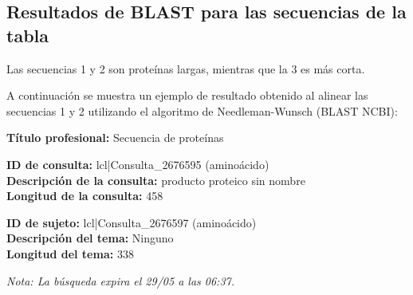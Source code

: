 \documentclass[fleqn,10pt]{article}
\begin{document}
\subsection*{Resultados de BLAST para las secuencias de la tabla}

Las secuencias 1 y 2 son proteínas largas, mientras que la 3 es más corta.

A continuación se muestra un ejemplo de resultado obtenido al alinear las secuencias 1 y 2 utilizando el algoritmo de Needleman-Wunsch (BLAST NCBI):

\begin{tcolorbox}[breakable, colback=gray!5!white, colframe=gray!75!black, title=Resultado de alineamiento (BLAST NCBI)]
\textbf{Título profesional:} Secuencia de proteínas

\textbf{ID de consulta:} lcl|Consulta\_2676595 (aminoácido)\\
\textbf{Descripción de la consulta:} producto proteico sin nombre\\
\textbf{Longitud de la consulta:} 458

\textbf{ID de sujeto:} lcl|Consulta\_2676597 (aminoácido)\\
\textbf{Descripción del tema:} Ninguno\\
\textbf{Longitud del tema:} 338

\textit{Nota: La búsqueda expira el 29/05 a las 06:37.}
\end{tcolorbox}
\end{document}
